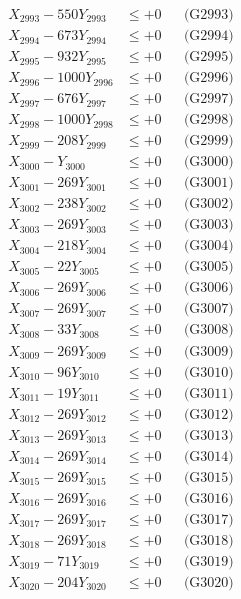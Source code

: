 \documentclass[a4paper,10pt]{article}
\begin{document}
{\begin{align}
X_{2993} - 550Y_{2993} &\leq +0 && \text{(G2993)} \\
X_{2994} - 673Y_{2994} &\leq +0 && \text{(G2994)} \\
X_{2995} - 932Y_{2995} &\leq +0 && \text{(G2995)} \\
X_{2996} - 1000Y_{2996} &\leq +0 && \text{(G2996)} \\
X_{2997} - 676Y_{2997} &\leq +0 && \text{(G2997)} \\
X_{2998} - 1000Y_{2998} &\leq +0 && \text{(G2998)} \\
X_{2999} - 208Y_{2999} &\leq +0 && \text{(G2999)} \\
X_{3000} - Y_{3000} &\leq +0 && \text{(G3000)} \\
\allowbreak
X_{3001} - 269Y_{3001} &\leq +0 && \text{(G3001)} \\
X_{3002} - 238Y_{3002} &\leq +0 && \text{(G3002)} \\
X_{3003} - 269Y_{3003} &\leq +0 && \text{(G3003)} \\
X_{3004} - 218Y_{3004} &\leq +0 && \text{(G3004)} \\
X_{3005} - 22Y_{3005} &\leq +0 && \text{(G3005)} \\
X_{3006} - 269Y_{3006} &\leq +0 && \text{(G3006)} \\
X_{3007} - 269Y_{3007} &\leq +0 && \text{(G3007)} \\
X_{3008} - 33Y_{3008} &\leq +0 && \text{(G3008)} \\
X_{3009} - 269Y_{3009} &\leq +0 && \text{(G3009)} \\
X_{3010} - 96Y_{3010} &\leq +0 && \text{(G3010)} \\
\allowbreak
X_{3011} - 19Y_{3011} &\leq +0 && \text{(G3011)} \\
X_{3012} - 269Y_{3012} &\leq +0 && \text{(G3012)} \\
X_{3013} - 269Y_{3013} &\leq +0 && \text{(G3013)} \\
X_{3014} - 269Y_{3014} &\leq +0 && \text{(G3014)} \\
X_{3015} - 269Y_{3015} &\leq +0 && \text{(G3015)} \\
X_{3016} - 269Y_{3016} &\leq +0 && \text{(G3016)} \\
X_{3017} - 269Y_{3017} &\leq +0 && \text{(G3017)} \\
X_{3018} - 269Y_{3018} &\leq +0 && \text{(G3018)} \\
X_{3019} - 71Y_{3019} &\leq +0 && \text{(G3019)} \\
X_{3020} - 204Y_{3020} &\leq +0 && \text{(G3020)} \\

\end{align}}
\end{document}
